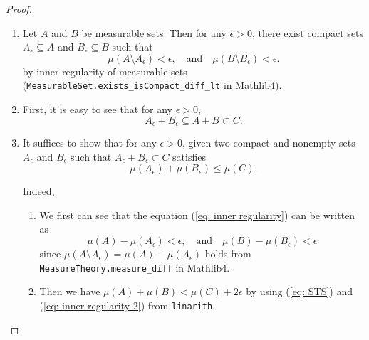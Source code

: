 \begin{proof}
\begin{enumerate}
        \begin{enumerate}
            \item Let \(A\) and \(B\) be measurable sets. Then for any \(\epsilon>0\), there exist compact sets \(A_\epsilon \subseteq A\) and \(B_\epsilon \subseteq B\) such that
            \begin{equation}
                \mu(A \setminus A_\epsilon)< \epsilon, \quad \text{and} \quad \mu(B \setminus B_\epsilon) < \epsilon.
                \label{eq: inner regularity}
            \end{equation}
            by inner regularity of measurable sets (\texttt{MeasurableSet.exists\_isCompact\_diff\_lt} in Mathlib4).

            \item First, it is easy to see that for any \(\epsilon>0\),
            \begin{equation*}
                A_\epsilon + B_\epsilon \subseteq A + B \subset C.
            \end{equation*}

            \item It suffices to show that for any \(\epsilon>0\), given two compact and {\color{red}nonempty} sets \(A_\epsilon\) and \(B_\epsilon\) such that
            {\color{red}
            \(A_\epsilon + B_\epsilon \subset C\) satisfies
            \begin{equation}
                \mu(A_\epsilon) + \mu(B_\epsilon) \leq \mu(C).
                \label{eq: STS}
            \end{equation}
            }

            Indeed,
            \begin{enumerate}
            \item
              We first can see that the equation (\ref{eq: inner regularity}) can be written as
              \begin{equation}
                \mu(A)-\mu(A_\epsilon) < \epsilon, \quad \text{and} \quad \mu(B) - \mu(B_\epsilon) < \epsilon
                \label{eq: inner regularity 2}
              \end{equation}
              since \(\mu(A\setminus A_\epsilon) = \mu(A)-\mu(A_\epsilon)\) holds from \texttt{MeasureTheory.measure\_diff} in Mathlib4.

            \item Then we have \(\mu(A) + \mu(B) < \mu(C) + 2\epsilon\) by using (\ref{eq: STS}) and (\ref{eq: inner regularity 2}) from \texttt{linarith}.


\end{enumerate}
\end{enumerate}
\end{enumerate}
\end{proof}
